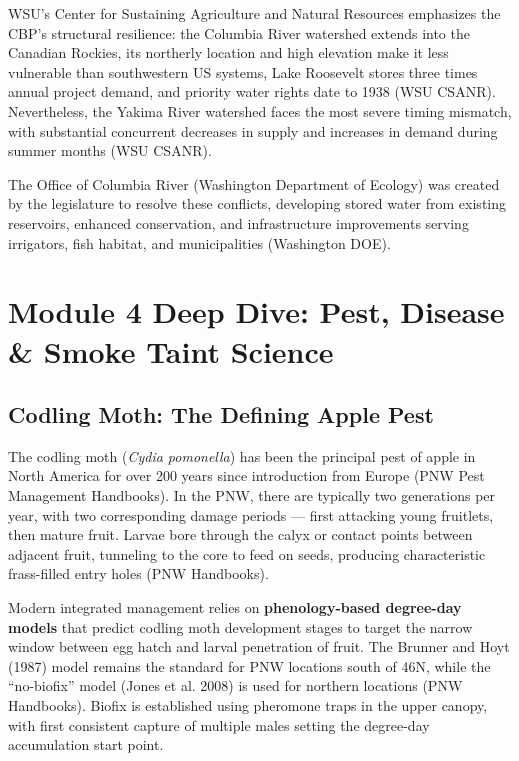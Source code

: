 \documentclass[11pt,letterpaper]{article}
\begin{document}
WSU's Center for Sustaining Agriculture and Natural Resources emphasizes the CBP's structural resilience: the Columbia River watershed extends into the Canadian Rockies, its northerly location and high elevation make it less vulnerable than southwestern US systems, Lake Roosevelt stores three times annual project demand, and priority water rights date to 1938 (WSU CSANR). Nevertheless, the Yakima River watershed faces the most severe timing mismatch, with substantial concurrent decreases in supply and increases in demand during summer months (WSU CSANR).

The Office of Columbia River (Washington Department of Ecology) was created by the legislature to resolve these conflicts, developing stored water from existing reservoirs, enhanced conservation, and infrastructure improvements serving irrigators, fish habitat, and municipalities (Washington DOE).

\newpage
\section{Module 4 Deep Dive: Pest, Disease \& Smoke Taint Science}

\subsection{Codling Moth: The Defining Apple Pest}

The codling moth (\textit{Cydia pomonella}) has been the principal pest of apple in North America for over 200 years since introduction from Europe (PNW Pest Management Handbooks). In the PNW, there are typically two generations per year, with two corresponding damage periods --- first attacking young fruitlets, then mature fruit. Larvae bore through the calyx or contact points between adjacent fruit, tunneling to the core to feed on seeds, producing characteristic frass-filled entry holes (PNW Handbooks).

Modern integrated management relies on \textbf{phenology-based degree-day models} that predict codling moth development stages to target the narrow window between egg hatch and larval penetration of fruit. The Brunner and Hoyt (1987) model remains the standard for PNW locations south of 46\textdegree N, while the ``no-biofix'' model (Jones et al. 2008) is used for northern locations (PNW Handbooks). Biofix is established using pheromone traps in the upper canopy, with first consistent capture of multiple males setting the degree-day accumulation start point.
\end{document}
